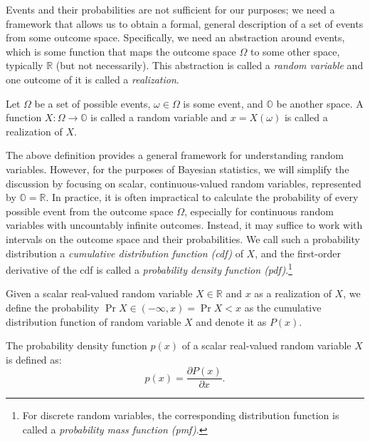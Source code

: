 Events and their probabilities are not sufficient for our purposes;
we need a framework that allows us to obtain a formal, general description of a set
of events from some outcome space. Specifically, we need an abstraction around events,
which is some function that maps the outcome space $\Omega$ to some other space,
typically $\mathbb{R}$ (but not necessarily). This abstraction is called a
\textit{random variable} and one outcome of it is called a \textit{realization}.

\begin{definition}
    Let $\Omega$ be a set of possible events, $\omega \in \Omega$ is some event,
    and $\mathbb{O}$ be another space. A function $X: \Omega \rightarrow \mathbb{O}$
    is called a random variable and $x = X(\omega)$ is called a realization of $X$.
\end{definition}

The above definition provides a general framework for understanding random variables.
However, for the purposes of Bayesian statistics, we will simplify the discussion by
focusing on scalar, continuous-valued random variables, represented
by $\mathbb{O} = \mathbb{R}$. In practice, it is often impractical to calculate the
probability of every possible event from the outcome space $\Omega$, especially for
continuous random variables with uncountably infinite outcomes. Instead, it may suffice
to work with intervals on the outcome space and their probabilities. We call such a
probability distribution a \textit{cumulative distribution function (cdf)} of $X$,
and the first-order derivative of the cdf is called a \textit{probability density
function (pdf)}.\footnote{
    For discrete random variables, the corresponding distribution function is
    called a \textit{probability mass function (pmf)}.
}

\begin{definition}
    Given a scalar real-valued random variable $X \in \mathbb{R}$ and $x$ as a
    realization of $X$, we define the probability $\Pr{X \in (-\infty, x)} = \Pr{X < x}$
    as the cumulative distribution function of random variable $X$ and denote it as $P(x)$.
\end{definition}

\begin{definition}
    The probability density function $p(x)$ of a scalar real-valued random variable $X$
    is defined as:
    $$
    p(x) = \frac{\partial P(x)}{\partial x}.
    $$
\end{definition}

